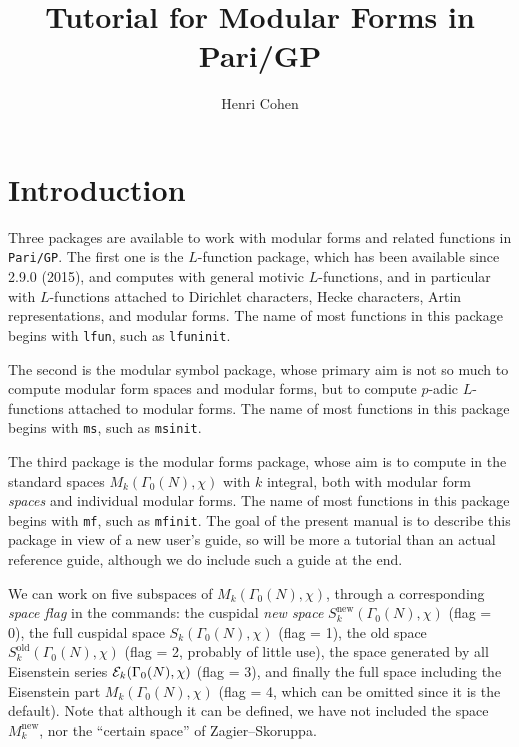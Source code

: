 \documentclass[11pt]{article}
\newcommand{\G}{\Gamma}
\newcommand{\new}{\text{new}}
\def\kbd#1{{\tt #1}}
\begin{document}
\pagestyle{plain}

\title{Tutorial for Modular Forms in Pari/GP}
\author{Henri Cohen}

\maketitle

\smallskip

\section{Introduction}

Three packages are available to work with modular forms and related functions
in \kbd{Pari/GP}. The first one is the $L$-function package, which has been
available since 2.9.0 (2015), and computes with general motivic
$L$-functions, and in particular with $L$-functions attached to Dirichlet
characters, Hecke characters, Artin representations, and modular forms. The
name of most functions in this package begins with \kbd{lfun}, such as
\kbd{lfuninit}.

The second is the modular symbol package, whose primary aim
is not so much to compute modular form spaces and modular forms, but to
compute $p$-adic $L$-functions attached to modular forms. The name of most
functions in this package begins with \kbd{ms}, such as \kbd{msinit}.

The third package is the modular forms package, whose aim is to compute in
the standard spaces $M_k(\G_0(N),\chi)$ with $k$ integral, both with modular
form \emph{spaces} and individual modular forms. The name of most functions in
this package begins with \kbd{mf}, such as \kbd{mfinit}. The goal of the
present manual is to describe this package in view of a new user's guide, so
will be more a tutorial than an actual reference guide, although we do include
such a guide at the end.

\medskip

We can work on five subspaces of $M_k(\G_0(N),\chi)$, through a
corresponding \emph{space flag} in the commands: the cuspidal \emph{new
space} $S_k^{\new}(\G_0(N),\chi)$ (flag = 0), the full cuspidal space
$S_k(\G_0(N),\chi)$ (flag = 1), the old space $S_k^{\text{old}}(\G_0(N),\chi)$
(flag = 2, probably of little use), the space generated by all Eisenstein
series ${\cal E}_k(\G_0(N),\chi)$ (flag = 3), and finally the full space
including the Eisenstein part $M_k(\G_0(N),\chi)$ (flag = 4, which can be
omitted since it is the default). Note that although it can be defined, we have
not included the space $M_k^{\new}$, nor the ``certain space'' of
Zagier--Skoruppa.
\end{document}

